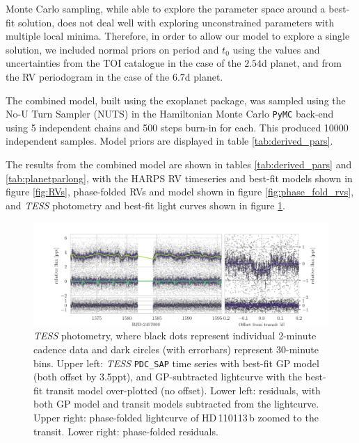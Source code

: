 \documentclass[fleqn,usenatbib]{mnras}
\newcommand{\tess}{{\it TESS}}
\newcommand{\harps}{{HARPS}}
\newcommand{\Tplanet}{HD\,110113\,b}
\begin{document}
Monte Carlo sampling, while able to explore the parameter space around a best-fit solution, does not deal well with exploring unconstrained parameters with multiple local minima. 
Therefore, in order to allow our model to explore a single solution, we included normal priors on period and $t_0$ using the values and uncertainties from the TOI catalogue in the case of the $2.54$d planet, and from the RV periodogram in the case of the $6.7$d planet.

The combined model, built using the \textsf{exoplanet} \citep{exoplanet} package, was sampled using the No-U Turn Sampler (NUTS) in the Hamiltonian Monte Carlo \texttt{PyMC} back-end \citep{exoplanet:pymc3} using 5 independent chains and 500 steps burn-in for each.
This produced 10000 independent samples.
Model priors are displayed in table \ref{tab:derived_pars}.

The results from the combined model are shown in tables \ref{tab:derived_pars} and \ref{tab:planetparlong}, with the \harps{} RV timeseries and best-fit models shown in figure \ref{fig:RVs}, phase-folded RVs and model shown in figure \ref{fig:phase_fold_rvs}, and \tess{} photometry and best-fit light curves shown in figure \ref{fig:photometry}.

\begin{figure}
	\includegraphics[width=\textwidth, trim={1.45cm 0.2 0.95cm 0.5}]{Combined_phot_plot_3_GPs_nontransiting_c.pdf}
    \caption{\tess{} photometry, where black dots represent individual 2-minute cadence data and dark circles (with errorbars) represent 30-minute bins. Upper left: \tess{} \texttt{PDC\_SAP} time series with best-fit GP model (both offset by 3.5ppt), and GP-subtracted lightcurve with the best-fit transit model over-plotted (no offset). Lower left: residuals, with both GP model and transit models subtracted from the lightcurve. Upper right: phase-folded lightcurve of \Tplanet{} zoomed to the transit. Lower right: phase-folded residuals. }
    \label{fig:photometry}
\end{figure}
\end{document}
